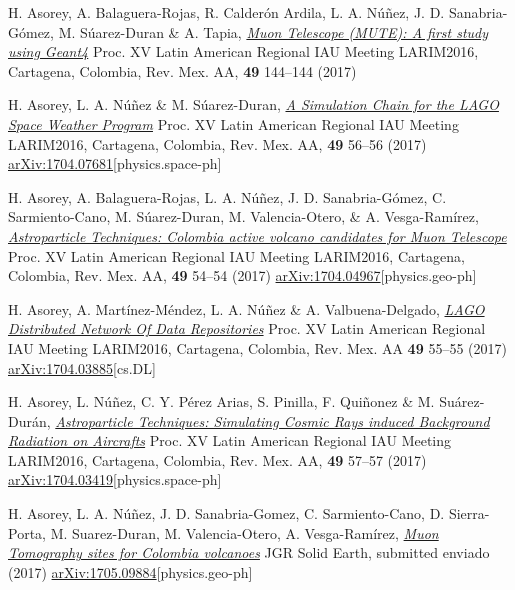 \begin{etaremune}
\item {} H. Asorey, A. Balaguera-Rojas, R. Calderón Ardila, L. A. Núñez, J. D. Sanabria-Gómez, M. Súarez-Duran \& A. Tapia, \href{http://www.astroscu.unam.mx/rmaa/RMxAC..49/PDF/RMxAC..49\_poster2.pdf}{\emph{Muon Telescope (MUTE): A first study using Geant4}} \en Proc. XV Latin American Regional IAU Meeting LARIM2016, Cartagena, Colombia, Rev. Mex. AA, {\bf{49}} 144--144 (2017)

\item {} H. Asorey, L. A. Núñez \& M. Súarez-Duran, \href{http://www.astroscu.unam.mx/rmaa/RMxAC..49/PDF/RMxAC..49\_oral6.pdf}{\emph{A Simulation Chain for the LAGO Space Weather Program}} \en Proc. XV Latin American Regional IAU Meeting LARIM2016, Cartagena, Colombia, Rev. Mex. AA, {\bf{49}} 56--56 (2017) \href{http://arxiv.org/abs/1704.07681}{arXiv:1704.07681}[physics.space-ph]

\item {} H. Asorey, A. Balaguera-Rojas, L. A. Núñez, J. D. Sanabria-Gómez, C. Sarmiento-Cano, M. Súarez-Duran, M. Valencia-Otero, \& A. Vesga-Ramírez, \href{http://www.astroscu.unam.mx/rmaa/RMxAC..49/PDF/RMxAC..49\_oral4.pdf}{\emph{Astroparticle Techniques: Colombia active volcano candidates for Muon Telescope}} \en Proc. XV Latin American Regional IAU Meeting LARIM2016, Cartagena, Colombia, Rev. Mex. AA, {\bf{49}} 54--54 (2017) \href{http://arxiv.org/abs/1704.04967}{arXiv:1704.04967}[physics.geo-ph]

\item {}H. Asorey, A. Martínez-Méndez, L. A. Núñez \& A. Valbuena-Delgado, \href{http://www.astroscu.unam.mx/rmaa/RMxAC..49/PDF/RMxAC..49\_oral5.pdf}{\emph{LAGO Distributed Network Of Data Repositories}} \en Proc. XV Latin American Regional IAU Meeting LARIM2016, Cartagena, Colombia, Rev. Mex. AA {\bf{49}} 55--55 (2017) \href{http://arxiv.org/abs/1704.03885}{arXiv:1704.03885}[cs.DL]

\item {}H. Asorey, L. Núñez, C. Y. Pérez Arias, S. Pinilla, F. Quiñonez \& M. Suárez-Durán, \href{http://www.astroscu.unam.mx/rmaa/RMxAC..49/PDF/RMxAC..49\_oral7.pdf}{\emph{Astroparticle Techniques: Simulating Cosmic Rays induced Background Radiation on Aircrafts}} \en Proc. XV Latin American Regional IAU Meeting LARIM2016, Cartagena, Colombia, Rev. Mex. AA, {\bf{49}} 57--57 (2017) \href{http://arxiv.org/abs/1704.03419}{arXiv:1704.03419}[physics.space-ph]

\item {}H. Asorey, L. A. Núñez, J. D. Sanabria-Gomez, C. Sarmiento-Cano, D. Sierra-Porta, M. Suarez-Duran, M. Valencia-Otero, A. Vesga-Ramírez, \href{}{\emph{Muon Tomography sites for Colombia volcanoes}} JGR Solid Earth, \ifeng submitted \else enviado \fi (2017) \href{http://arxiv.org/abs/1705.09884}{arXiv:1705.09884}[physics.geo-ph]
	

\end{etaremune}
